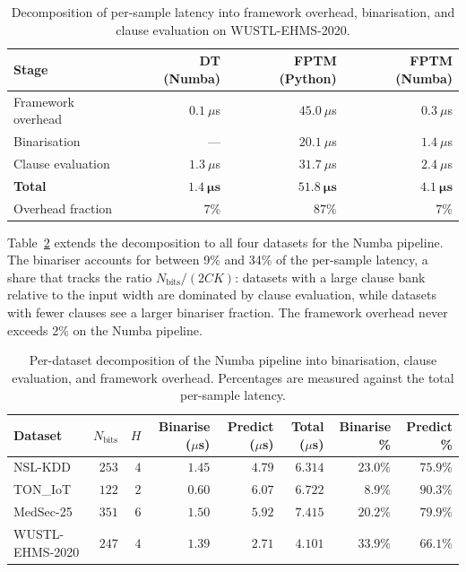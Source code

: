 \documentclass[journal,10pt]{IEEEtran}
\begin{document}
\begin{table}[t]
\centering\small
\caption{Decomposition of per-sample latency into framework overhead,
         binarisation, and clause evaluation on WUSTL-EHMS-2020.}
\label{tab:decomposition}
\begin{tabular}{lrrr}
\toprule
\textbf{Stage} & \textbf{DT (Numba)} & \textbf{FPTM (Python)} & \textbf{FPTM (Numba)} \\
\midrule
Framework overhead & $0.1~\mu$s  & $45.0~\mu$s & $0.3~\mu$s \\
Binarisation       & ---         & $20.1~\mu$s & $1.4~\mu$s \\
Clause evaluation  & $1.3~\mu$s  & $31.7~\mu$s & $2.4~\mu$s \\
\midrule
\textbf{Total}     & $\mathbf{1.4~\mu s}$ & $\mathbf{51.8~\mu s}$ & $\mathbf{4.1~\mu s}$ \\
Overhead fraction  & $7\%$       & $87\%$      & $7\%$       \\
\bottomrule
\end{tabular}
\end{table}

Table~\ref{tab:decomposition_full} extends the decomposition to all
four datasets for the Numba pipeline. The binariser accounts
for between 9\% and 34\% of the per-sample latency, a share that
tracks the ratio $N_\text{bits}/(2CK)$: datasets with a large clause
bank relative to the input width are dominated by clause evaluation,
while datasets with fewer clauses see a larger binariser fraction.
The framework overhead never exceeds 2\% on the Numba pipeline.

\begin{table}[t]
\centering\small
\caption{Per-dataset decomposition of the Numba pipeline into
         binarisation, clause evaluation, and framework overhead.
         Percentages are measured against the total per-sample latency.}
\label{tab:decomposition_full}
\begin{tabular}{lrrrrrrr}
\toprule
\textbf{Dataset} & $N_\text{bits}$ & $H$ & \textbf{Binarise ($\mu$s)} & \textbf{Predict ($\mu$s)} & \textbf{Total ($\mu$s)} & \textbf{Binarise \%} & \textbf{Predict \%} \\
\midrule
NSL-KDD         & $253$ & $4$ & $1.45$ & $4.79$ & $6.314$ & $23.0\%$ & $75.9\%$ \\
TON\_IoT        & $122$ & $2$ & $0.60$ & $6.07$ & $6.722$ & $8.9\%$  & $90.3\%$ \\
MedSec-25       & $351$ & $6$ & $1.50$ & $5.92$ & $7.415$ & $20.2\%$ & $79.9\%$ \\
WUSTL-EHMS-2020 & $247$ & $4$ & $1.39$ & $2.71$ & $4.101$ & $33.9\%$ & $66.1\%$ \\
\bottomrule
\end{tabular}
\end{table}
\end{document}

